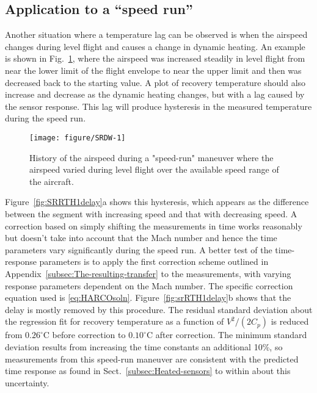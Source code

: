 \documentclass[11pt,twoside,american,12pt,twoside,american]{article}\usepackage[]{graphicx}\usepackage[]{color}
\makeatletter
\def\maxwidth{ %
  \ifdim\Gin@nat@width>\linewidth
    \linewidth
  \else
    \Gin@nat@width
  \fi
}
\newenvironment{knitrout}{}{} %
\makeatother
\begin{document}
\subsection{Application to a ``speed run''}

Another situation where a temperature lag can be observed is when
the airspeed changes during level flight and causes a change in dynamic
heating. An example is shown in Fig.~\ref{fig:SRDW}, where the airspeed
was increased steadily in level flight from near the lower limit of
the flight envelope to near the upper limit and then was decreased
back to the starting value. A plot of recovery temperature should
also increase and decrease as the dynamic heating changes, but with
a lag caused by the sensor response. This lag will produce hysteresis
in the measured temperature during the speed run.

\begin{knitrout}
\color{fgcolor}\begin{figure}[t]

{\centering \texttt{[image: figure/SRDW-1]} 

}

\caption[History of the airspeed during a  "speed-run" maneuver where the airspeed varied during level flight over the available speed range of the aircraft]{History of the airspeed during a  "speed-run" maneuver where the airspeed varied during level flight over the available speed range of the aircraft.}\label{fig:SRDW}
\end{figure}


\end{knitrout}

Figure~\ref{fig:SRRTH1delay}a shows this hysteresis, which appears
as the difference between the segment with increasing speed and that
with decreasing speed. A correction based on simply shifting the
measurements in time works reasonably but doesn't take into account
that the Mach number and hence the time parameters vary significantly
during the speed run. A better test of the time-response parameters
is to apply the first correction scheme outlined in Appendix~\ref{subsec:The-resulting-transfer}
to the measurements, with varying response parameters dependent on
the Mach number. The specific correction equation used is \eqref{eq:HARCOsoln}.
Figure~\ref{fig:srRTH1delay}b shows that the delay is mostly removed
by this procedure. The residual standard deviation about the regression
fit for recovery temperature as a function of $V^{2}/(2C_{p})$ is
reduced from $0.26^{\circ}$C before correction to $0.10^{\circ}$C
after correction. The minimum standard deviation results from increasing
the time constants an additional 10\%, so measurements from this speed-run
maneuver are consistent with the predicted time response as found
in Sect.~\ref{subsec:Heated-sensors} to within about this uncertainty.
\end{document}
